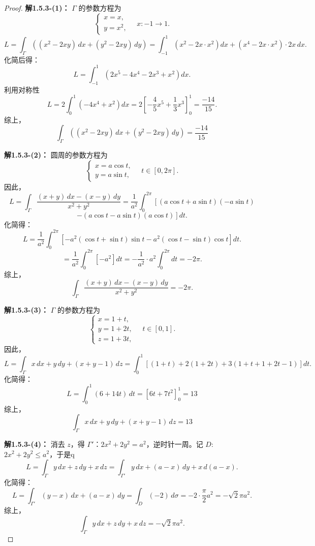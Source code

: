 \documentclass[12pt]{ctexart}
\begin{document}
\begin{proof}
	\textbf{解1.5.3-(1)：} $\Gamma$ 的参数方程为
\[
\begin{cases}
x = x, \\
y = x^2,
\end{cases}
\quad x: -1 \to 1.
\]
\[
L=\int_\Gamma \left( (x^2 - 2xy) \, dx + (y^2 - 2xy) \, dy \right) = \int_{-1}^1 \left( x^2 - 2x \cdot x^2 \right) dx + \left( x^4 - 2x \cdot x^2 \right) \cdot 2x \, dx.
\]
化简后得：
\[
L = \int_{-1}^1 \left( 2x^5 - 4x^4 - 2x^3 + x^2 \right) dx.
\]
利用对称性
\[
L = 2 \int_0^1 \left( -4x^4 + x^2 \right) dx= 2 \left[ -\frac{4}{5}x^5 + \frac{1}{3}x^3 \right]_0^1 = \frac{-14}{15}.
\]
综上，
\[
\int_\Gamma \left( (x^2 - 2xy) \, dx + (y^2 - 2xy) \, dy \right) = \frac{-14}{15}
\]

\textbf{解1.5.3-(2)：} 圆周的参数方程为
\[
\begin{cases}
x = a \cos t, \\
y = a \sin t,
\end{cases}
\quad t \in [0, 2\pi].
\]
因此，
\[
L = \int_\Gamma \frac{(x + y) \, dx - (x - y) \, dy}{x^2 + y^2} = \frac{1}{a^2} \int_0^{2\pi} 
\left[ (a \cos t + a \sin t)(-a \sin t) \right. 
\]
\[
\left. - (a \cos t - a \sin t)(a \cos t) \right] dt.
\]
化简得：
\[
L = \frac{1}{a^2} \int_0^{2\pi} \left[ -a^2 (\cos t + \sin t)\sin t - a^2 (\cos t - \sin t)\cos t \right] dt.
\]
\[
= \frac{1}{a^2} \int_0^{2\pi} \left[ -a^2 \right] dt = -\frac{1}{a^2} \cdot a^2 \int_0^{2\pi} dt = -2\pi.
\]
综上，
\[
\int_\Gamma \frac{(x + y) \, dx - (x - y) \, dy}{x^2 + y^2} = -2\pi.
\]

\textbf{解1.5.3-(3)：} $\Gamma$ 的参数方程为
\[
\begin{cases}
x = 1 + t, \\
y = 1 + 2t, \\
z = 1 + 3t,
\end{cases}
\quad t \in [0, 1].
\]
因此，
\[
L = \int_\Gamma x \, dx + y \, dy + (x + y - 1) \, dz = \int_0^1 \left[ (1 + t) + 2(1 + 2t) + 3(1 + t + 1 + 2t - 1) \right] dt.
\]
化简得：
\[
L = \int_0^1 (6 + 14t) \, dt =\left[ 6t + 7t^2 \right]_0^1 = 13
\]
综上，
\[
\int_\Gamma x \, dx + y \, dy + (x + y - 1) \, dz = 13
\]

\textbf{解1.5.3-(4)：} 消去 $z$，得 $\Gamma'$：$2x^2 + 2y^2 = a^2$，逆时针一周。记 $D$: $2x^2 + 2y^2 \leq a^2$，于是q
\[
L = \int_\Gamma y \, dx + z \, dy + x \, dz = \int_{\Gamma'} y \, dx + (a - x) \, dy + x \, d(a - x).
\]
化简得：
\[
L = \int_{\Gamma'} (y - x) \, dx + (a - x) \, dy = \int_D (-2) \, d\sigma = -2 \cdot \frac{\pi}{2} a^2 = -\sqrt{2} \pi a^2.
\]
综上，
\[
\int_\Gamma y \, dx + z \, dy + x \, dz = -\sqrt{2} \pi a^2.
\]
\end{proof}
\end{document}
